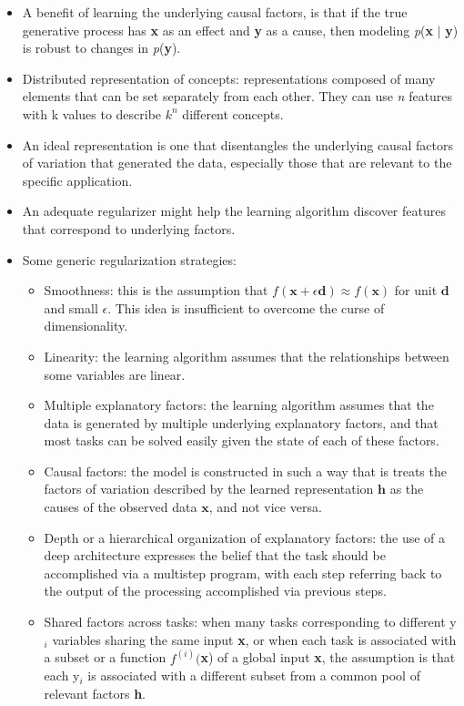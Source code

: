 \documentclass{article}
\begin{document}
\begin{itemize}
\item A benefit of learning the underlying causal factors, is that if the true generative process has \textbf{x} as an effect and \textbf{y} as a cause, then modeling \textit{p}(\textbf{x} \(|\) \textbf{y}) is robust to changes in \textit{p}(\textbf{y}).
\item Distributed representation of concepts: representations composed of many elements that can be set separately from each other. They can use \textit{n} features with \textnormal{k} values to describe \(k^n\) different concepts.
\item An ideal representation is one that disentangles the underlying causal factors of variation that generated the data, especially those that are relevant to the specific application.
\item An adequate regularizer might help the learning algorithm discover features that correspond to underlying factors.
\item Some generic regularization strategies:
\begin{itemize}
\item Smoothness: this is the assumption that \(f(\boldsymbol{x} + \epsilon \boldsymbol{d}) \approx f(\boldsymbol{x})\) for unit \(\boldsymbol{d}\) and small \(\epsilon\). This idea is insufficient to overcome the curse of dimensionality.
\item Linearity: the learning algorithm assumes that the relationships between some variables are linear.
\item Multiple explanatory factors: the learning algorithm assumes that the data is generated by multiple underlying explanatory factors, and that most tasks can be solved easily given the state of each of these factors.
\item Causal factors: the model is constructed in such a way that is treats the factors of variation described by the learned representation \(\boldsymbol{h}\) as the causes of the observed data \(\boldsymbol{x}\), and not vice versa.
\item Depth or a hierarchical organization of explanatory factors: the use of a deep architecture expresses the belief that the task should be accomplished via a multistep program, with each step referring back to the output of the processing accomplished via previous steps.
\item Shared factors across tasks: when many tasks corresponding to different y\(_i\) variables sharing the same input \textbf{x}, or when each task is associated with a subset or a function \(f^{(i)}(\)\textbf{x}) of a global input \textbf{x}, the assumption is that each y\(_i\) is associated with a different subset from a common pool of relevant factors \textbf{h}.

\end{itemize}
\end{itemize}
\end{document}
